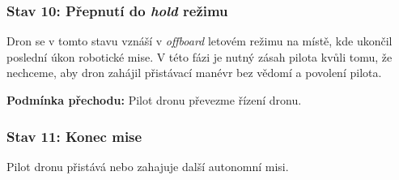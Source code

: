 \subsubsection{Stav 10: Přepnutí do \textit{hold} režimu}

Dron se v tomto stavu vznáší v \textit{offboard} letovém režimu na místě, kde ukončil poslední úkon robotické mise. V této fázi je nutný zásah pilota kvůli tomu, že nechceme, aby dron zahájil přistávací manévr bez vědomí a povolení pilota.

\noindent\textbf{Podmínka přechodu:} Pilot dronu převezme řízení dronu.

\subsubsection{Stav 11: Konec mise}

Pilot dronu přistává nebo zahajuje další autonomní misi.

